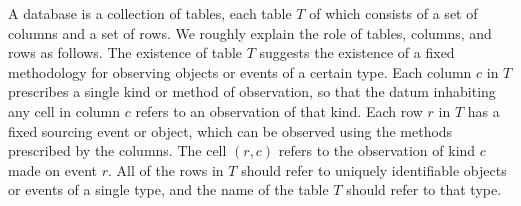 \documentclass[../main/CT4S-EN-RU]{subfiles}
\begin{document}
\begin{blockENG}
A database is a collection of tables, each table $T$ of which consists of a set of columns and a set of rows. We roughly explain the role of tables, columns, and rows as follows. The existence of table $T$ suggests the existence of a fixed methodology for observing objects or events of a certain type. Each column $c$ in $T$ prescribes a single kind or method of observation, so that the datum inhabiting any cell in column $c$ refers to an observation of that kind. Each row $r$ in $T$ has a fixed sourcing event or object, which can be observed using the methods prescribed by the columns. The cell $(r,c)$ refers to the observation of kind $c$ made on event $r.$ All of the rows in $T$ should refer to uniquely identifiable objects or events of a single type, and the name of the table $T$ should refer to that type.
\end{blockENG}

\begin{blockRUS}
\end{blockRUS}
\end{document}
